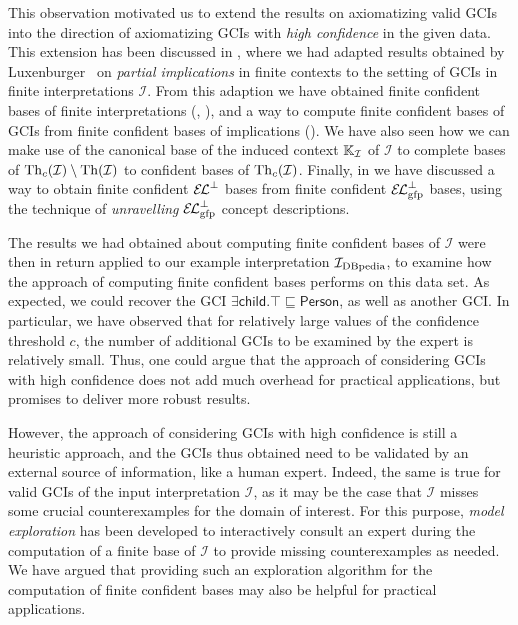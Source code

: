 This observation motivated us to extend the results on axiomatizing valid GCIs into the
direction of axiomatizing GCIs with \emph{high confidence} in the given data.  This
extension has been discussed in , where we had adapted results
obtained by Luxenburger~\cite{diss:Luxenburger} on \emph{partial implications} in finite
contexts to the setting of GCIs in finite interpretations $\mathcal{I}$.  From this
adaption we have obtained finite confident bases of finite interpretations
(, ), and a way to compute finite
confident bases of GCIs from finite confident bases of implications
().  We have also
seen how we can make use of the canonical base of the induced context ${\mathbb{K}}_{\mathcal{I}}$ of $\mathcal{I}$ to complete bases of $\operatorname{Th}_{c}(\mathcal{I}) \setminus
\operatorname{Th}(\mathcal{I})$ to confident bases of $\operatorname{Th}_{c}(\mathcal{I})$.  Finally, in
 we have discussed a way to obtain finite confident ${{\mathcal{E}\kern-.3ex\mathcal{L}}^\bot}$
bases from finite confident $\ELgfpbot$ bases, using the technique of \emph{unravelling}
$\ELgfpbot$ concept descriptions.

The results we had obtained about computing finite confident bases of $\mathcal{I}$ were
then in return applied to our example interpretation ${\mathcal{I}_{\text{DBpedia}}}$, to examine how the
approach of computing finite confident bases performs on this data set.  As expected, we
could recover the GCI $\exists \mathsf{child}. \top \sqsubseteq \mathsf{Person}$, as well
as another GCI.  In particular, we have observed that for relatively large values of the
confidence threshold $c$, the number of additional GCIs to be examined by the expert is
relatively small.  Thus, one could argue that the approach of considering GCIs with high
confidence does not add much overhead for practical applications, but promises to deliver
more robust results.

However, the approach of considering GCIs with high confidence is still a heuristic
approach, and the GCIs thus obtained need to be validated by an external source of
information, like a human expert.  Indeed, the same is true for valid GCIs of the input
interpretation $\mathcal{I}$, as it may be the case that $\mathcal{I}$ misses some crucial
counterexamples for the domain of interest.  For this purpose, \emph{model exploration}
has been developed to interactively consult an expert during the computation of a finite
base of $\mathcal{I}$ to provide missing counterexamples as needed.  We have argued that
providing such an exploration algorithm for the computation of finite confident bases may
also be helpful for practical applications.

